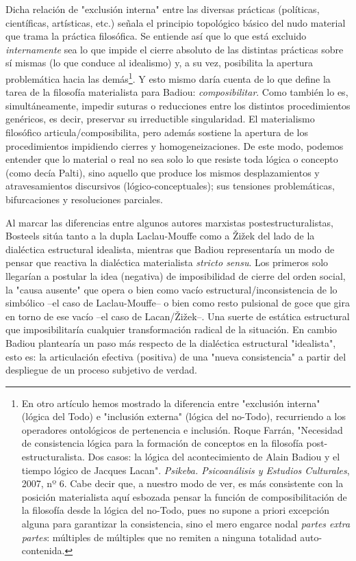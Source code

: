 \documentclass{book}
\begin{document}
Dicha relación de "exclusión interna" entre las diversas prácticas
(políticas, científicas, artísticas, etc.) señala el principio
topológico básico del nudo material que trama la práctica filosófica. Se
entiende así que lo que está excluido \emph{internamente} sea lo que
impide el cierre absoluto de las distintas prácticas sobre sí mismas (lo
que conduce al idealismo) y, a su vez, posibilita la apertura
problemática hacia las demás\footnote{En otro artículo hemos mostrado la
  diferencia entre "exclusión interna" (lógica del Todo) e "inclusión
  externa" (lógica del no-Todo), recurriendo a los operadores
  ontológicos de pertenencia e inclusión. Roque Farrán, "Necesidad de
  consistencia lógica para la formación de conceptos en la filosofía
  post-estructuralista. Dos casos: la lógica del acontecimiento de Alain
  Badiou y el tiempo lógico de Jacques Lacan". \emph{Psikeba.
  Psicoanálisis y Estudios Culturales}, 2007, nº 6. Cabe decir que, a
  nuestro modo de ver, es más consistente con la posición materialista
  aquí esbozada pensar la función de composibilitación de la filosofía
  desde la lógica del no-Todo, pues no supone a priori excepción alguna
  para garantizar la consistencia, sino el mero engarce nodal
  \emph{partes extra partes}: múltiples de múltiples que no remiten a
  ninguna totalidad auto-contenida.}. Y esto mismo daría cuenta de lo
que define la tarea de la filosofía materialista para Badiou:
\emph{composibilitar}. Como también lo es, simultáneamente, impedir
suturas o reducciones entre los distintos procedimientos genéricos, es
decir, preservar su irreductible singularidad. El materialismo
filosófico articula/composibilita, pero además sostiene la apertura de
los procedimientos impidiendo cierres y homogeneizaciones. De este modo,
podemos entender que lo material o real no sea solo lo que resiste toda
lógica o concepto (como decía Palti), sino aquello que produce los
mismos desplazamientos y atravesamientos discursivos
(lógico-conceptuales); sus tensiones problemáticas, bifurcaciones y
resoluciones parciales.

Al marcar las diferencias entre algunos autores marxistas
postestructuralistas, Bosteels sitúa tanto a la dupla Laclau-Mouffe como
a Žižek del lado de la dialéctica estructural idealista, mientras que
Badiou representaría un modo de pensar que reactiva la dialéctica
materialista \emph{stricto sensu}. Los primeros solo llegarían a
postular la idea (negativa) de imposibilidad de cierre del orden social,
la "causa ausente" que opera o bien como vacío
estructural/inconsistencia de lo simbólico --el caso de Laclau-Mouffe--
o bien como resto pulsional de goce que gira en torno de ese vacío --el
caso de Lacan/Žižek--. Una suerte de estática estructural que
imposibilitaría cualquier transformación radical de la situación. En
cambio Badiou plantearía un paso más respecto de la dialéctica
estructural "idealista", esto es: la articulación efectiva (positiva) de
una "nueva consistencia" a partir del despliegue de un proceso subjetivo
de verdad.
\end{document}
